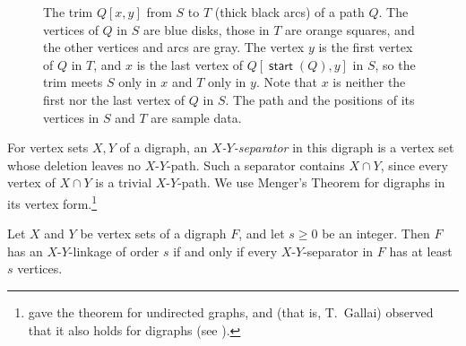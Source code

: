 \documentclass[fontsize=12pt,leading=14pt]{fullpaper}
\DeclareMathOperator{\st}{\mathsf{start}}
\begin{document}
\begin{figure}[ht]
  \centering
  \caption{The trim $Q[x,y]$ from $S$ to $T$ (thick black arcs) of a path $Q$.
    The vertices of $Q$ in $S$ are blue disks, those in $T$ are orange squares, and the other vertices and arcs are gray.
    The vertex $y$ is the first vertex of $Q$ in $T$, and $x$ is the last vertex of $Q[\st(Q),y]$ in $S$, so the trim meets $S$ only in $x$ and $T$ only in $y$.
    Note that $x$ is neither the first nor the last vertex of $Q$ in $S$.
  The path and the positions of its vertices in $S$ and $T$ are sample data.}
  \label{fig:trim}
\end{figure}

For vertex sets $X,Y$ of a digraph, an \emph{$X$-$Y$-separator} in this digraph is a vertex set whose deletion leaves no $X$-$Y$-path.
Such a separator contains $X\cap Y$, since every vertex of $X\cap Y$ is a trivial $X$-$Y$-path.
We use Menger's Theorem for digraphs in its vertex form.\footnote{\textcite{Menger27} gave the theorem for undirected graphs, and \textcite{Grunwald38} (that is, T.~Gallai) observed that it also holds for digraphs (see \textcite[Section~9.1]{Schrijver03}).}

\begin{proposition}\label{prop:menger}
  Let $X$ and $Y$ be vertex sets of a digraph $F$, and let $s\ge0$ be an integer.
  Then $F$ has an $X$-$Y$-linkage of order $s$ if and only if every $X$-$Y$-separator in $F$ has at least $s$ vertices.
\end{proposition}
\end{document}
